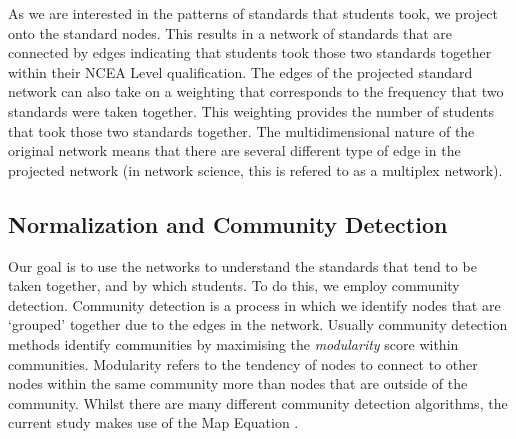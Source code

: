 \documentclass[a4paper]{article}
\begin{document}
As we are interested in the patterns of standards that students took, we project onto the standard nodes. This results in a network of standards that are connected by edges indicating that students took those two standards together within their NCEA Level qualification. The edges of the projected standard network can also take on a weighting that corresponds to the frequency that two standards were taken together. This weighting provides the number of students that took those two standards together. The multidimensional nature of the original network means that there are several different type of edge in the projected network (in network science, this is refered to as a multiplex network). 

\subsection{Normalization and Community Detection}
Our goal is to use the networks to understand the standards that tend to be taken together, and by which students. To do this, we employ community detection. Community detection is a process in which we identify nodes that are `grouped' together due to the edges in the network. Usually community detection methods identify communities by maximising the \textit{modularity} score within communities. Modularity refers to the tendency of nodes to connect to other nodes within the same community more than nodes that are outside of the community. Whilst there are many different community detection algorithms, the current study makes use of the Map Equation \cite{rosvall2009map}. 
\end{document}
